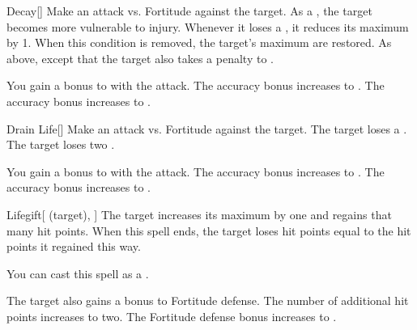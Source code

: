 \lowercase{\hypertarget{spell:Decay}{}}\label{spell:Decay}
\begin{freeability}[Rank 1]{\hypertarget{spell:Decay}{Decay}}[]
Make an attack vs. Fortitude against the target.
\hit As a , the target becomes more vulnerable to injury.
Whenever it loses a , it reduces its maximum  by 1.
When this condition is removed, the target's maximum  are restored.
\crit As above, except that the target also takes a  penalty to .

\rankline
{} You gain a  bonus to  with the attack.
 The accuracy bonus increases to .
 The accuracy bonus increases to .
\end{freeability}
\vspace{0.25em}



\lowercase{\hypertarget{spell:Drain Life}{}}\label{spell:Drain Life}
\begin{freeability}[Rank 1]{\hypertarget{spell:Drain Life}{Drain Life}}[]
Make an attack vs. Fortitude against the target.
\hit The target loses a .
\crit The target loses two .

\rankline
{} You gain a  bonus to  with the attack.
 The accuracy bonus increases to .
 The accuracy bonus increases to .
\end{freeability}
\vspace{0.25em}



\lowercase{\hypertarget{spell:Lifegift}{}}\label{spell:Lifegift}
\begin{attuneability}[Rank 1]{\hypertarget{spell:Lifegift}{Lifegift}}[ (target), ]
The target increases its maximum  by one and regains that many hit points.
When this spell ends, the target loses hit points equal to the hit points it regained this way.

You can cast this spell as a .

\rankline
{} The target also gains a  bonus to Fortitude defense.
 The number of additional hit points increases to two.
 The Fortitude defense bonus increases to .
\end{attuneability}
\vspace{0.25em}



